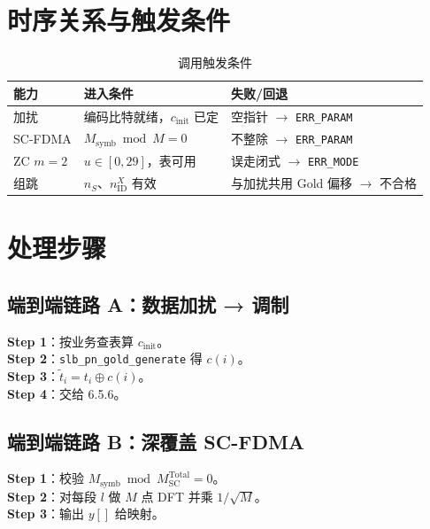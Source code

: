 \documentclass[11pt,a4paper]{ctexart}
\begin{document}
\section{时序关系与触发条件}

\begin{longtable}{L{3.5cm}L{5.5cm}L{5.5cm}}
\caption{调用触发条件\label{tab:6579-trig}} \\
\toprule
\textbf{能力} & \textbf{进入条件} & \textbf{失败/回退} \\
\midrule
加扰 & 编码比特就绪，$c_{\mathrm{init}}$ 已定 & 空指针 $\rightarrow$ \texttt{ERR\_PARAM} \\
SC-FDMA & $M_{\mathrm{symb}}\bmod M{=}0$ & 不整除 $\rightarrow$ \texttt{ERR\_PARAM} \\
ZC $m{=}2$ & $u\in[0,29]$，表可用 & 误走闭式 $\rightarrow$ \texttt{ERR\_MODE} \\
组跳 & $n_S$、$n_{\mathrm{ID}}^X$ 有效 & 与加扰共用 Gold 偏移 $\rightarrow$ 不合格 \\
\bottomrule
\end{longtable}

\section{处理步骤}

\subsection{端到端链路 A：数据加扰 → 调制}

\textbf{Step 1}：按业务查表算 $c_{\mathrm{init}}$。\\
\textbf{Step 2}：\texttt{slb\_pn\_gold\_generate} 得 $c(i)$。\\
\textbf{Step 3}：$\tilde{t}_i=t_i\oplus c(i)$。\\
\textbf{Step 4}：交给 6.5.6。

\subsection{端到端链路 B：深覆盖 SC-FDMA}

\textbf{Step 1}：校验 $M_{\mathrm{symb}}\bmod M_{\mathrm{SC}}^{\mathrm{Total}}{=}0$。\\
\textbf{Step 2}：对每段 $l$ 做 $M$ 点 DFT 并乘 $1/\sqrt{M}$。\\
\textbf{Step 3}：输出 $y[]$ 给映射。
\end{document}
